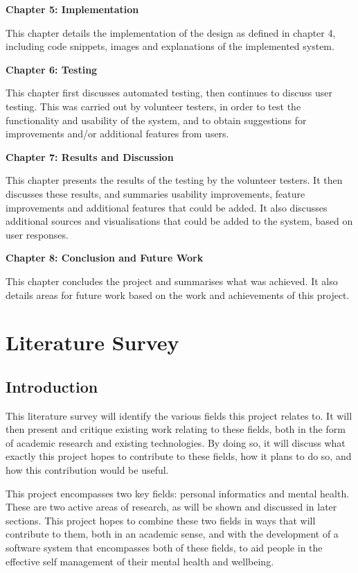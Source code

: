 \documentclass[11pt,openright,a4paper]{report}
\begin{document}
\textbf{Chapter 5: Implementation}

This chapter details the implementation of the design as defined in chapter 4, including code snippets, images and explanations of the implemented system.

\textbf{Chapter 6: Testing}

This chapter first discusses automated testing, then continues to discuss user testing. This was carried out by volunteer testers, in order to test the functionality and usability of the system, and to obtain suggestions for improvements and/or additional features from users.

\textbf{Chapter 7: Results and Discussion}

This chapter presents the results of the testing by the volunteer testers. It then discusses these results, and summaries usability improvements, feature improvements and additional features that could be added. It also discusses additional sources and visualisations that could be added to the system, based on user responses.

\textbf{Chapter 8: Conclusion and Future Work}

This chapter concludes the project and summarises what was achieved. It also details areas for future work based on the work and achievements of this project.

\chapter{Literature Survey} \label{litsurvey}
\section{Introduction} \label{introduction}
This literature survey will identify the various fields this project relates to. It will then present and critique existing work relating to these fields, both in the form of academic research and existing technologies. By doing so, it will discuss what exactly this project hopes to contribute to these fields, how it plans to do so, and how this contribution would be useful.

This project encompasses two key fields: personal informatics and mental health. These are two active areas of research, as will be shown and discussed in later sections. This project hopes to combine these two fields in ways that will contribute to them, both in an academic sense, and with the development of a software system that encompasses both of these fields, to aid people in the effective self management of their mental health and wellbeing.
\end{document}
